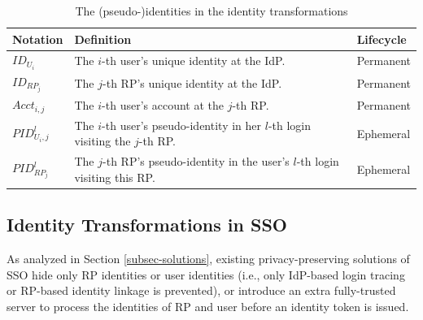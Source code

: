 
\begin{table}[t]
\footnotesize
    \caption{The (pseudo-)identities in the identity transformations}
    \centering
    \begin{tabular}{|l|p{5.15cm}|l|} \hline
    {\textbf{Notation}} & {\textbf{Definition}} & {\textbf{Lifecycle}} \\ \hline
    {$ID_{U_i}$} & {The $i$-th user's unique identity at the IdP.} & {Permanent} \\ \hline
    {$ID_{RP_j}$} & {The $j$-th RP's unique identity at the IdP.} & {Permanent} \\ \hline
    {$Acct_{i,j}$} & {The $i$-th user's account at the $j$-th RP.} & {Permanent} \\ \hline
    {$PID_{U_i,j}^l$} & {The $i$-th user's pseudo-identity in her $l$-th login visiting the $j$-th RP.} & {Ephemeral} \\ \hline
    {$PID_{RP_j}^l$} & {The $j$-th RP's pseudo-identity in the user's $l$-th login visiting this RP.} & {Ephemeral} \\ \hline
    \end{tabular}
    \label{tbl:notations-dilemma}
\end{table}


\subsection{Identity Transformations in SSO}
\label{subsec:solutions}


As analyzed in Section \ref{subsec-solutions},
    existing privacy-preserving solutions of SSO hide only RP identities or user identities
    (i.e., only IdP-based login tracing or RP-based identity linkage is prevented),
        or introduce an extra fully-trusted server to process the identities of RP and user before an identity token is issued.

